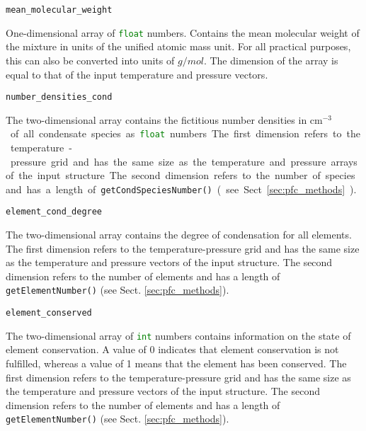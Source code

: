 \documentclass[numbers=noenddot]{aux/fcmanual}
\begin{document}
\bigbreak

\lstinline!mean_molecular_weight!
\begin{addmargin}[25pt]{0pt}
	One-dimensional array of \lstinline[language=Python]!float! numbers. Contains the mean molecular weight of the mixture in units of the unified atomic mass unit. For all practical purposes, this can also be converted into units of $\unit{g/mol}$. The dimension of the array is equal to that of the input temperature and pressure vectors.
\end{addmargin}

\bigbreak

\lstinline!number_densities_cond!
\begin{addmargin}[25pt]{0pt}
	The two-dimensional array contains the fictitious number densities in \unit{cm$^{-3}$} of all condensate species  as \lstinline[language=Python]!float! numbers. The first dimension refers to the temperature-pressure grid and has the same size as the temperature and pressure arrays of the input structure. The second dimension refers to the number of species and has a length of \lstinline!getCondSpeciesNumber()! (see Sect. \ref{sec:pfc_methods}).
\end{addmargin}

\bigbreak

\lstinline!element_cond_degree!
\begin{addmargin}[25pt]{0pt}
	The two-dimensional array contains the degree of condensation for all elements. The first dimension refers to the temperature-pressure grid and has the same size as the temperature and pressure vectors of the input structure. The second dimension refers to the number of elements and has a length of \lstinline!getElementNumber()! (see Sect. \ref{sec:pfc_methods}).
\end{addmargin}

\bigbreak

\lstinline!element_conserved!
\begin{addmargin}[25pt]{0pt}
	The two-dimensional array of \lstinline[language=Python]!int! numbers contains information on the state of element conservation. A value of 0 indicates that element conservation is not fulfilled, whereas a value of 1 means that the element has been conserved. The first dimension refers to the temperature-pressure grid and has the same size as the temperature and pressure vectors of the input structure. The second dimension refers to the number of elements and has a length of \lstinline!getElementNumber()! (see Sect. \ref{sec:pfc_methods}).
\end{addmargin}
\end{document}
